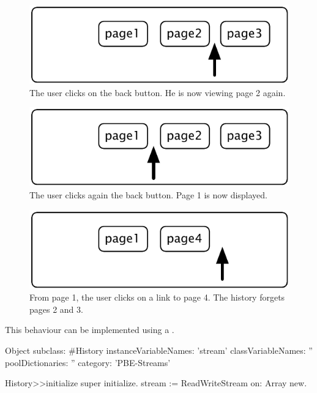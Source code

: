 \documentclass[a4paper,10pt,twoside]{book}
\begin{document}
\begin{figure}[!ht]
\centerline{\includegraphics[scale=0.5]{page2_Stef}}
\caption{The user clicks on the back button. He is now viewing page 2 again.}
\label{fig:page2_}
\vspace{.2in}
\end{figure}

\begin{figure}[!ht]
\centerline{\includegraphics[scale=0.5]{page1_Stef}}
\caption{The user clicks again the back button. Page 1 is now displayed.}
\label{fig:page1_}
\vspace{.2in}
\end{figure}

\begin{figure}[!ht]
\centerline{\includegraphics[scale=0.5]{page4Stef}}
\caption{From page 1, the user clicks on a link to page 4. The history forgets pages 2 and 3.}
\label{fig:page4}
\vspace{.2in}
\end{figure}

This behaviour can be implemented using a .

\begin{code}{}
Object subclass: #History
  instanceVariableNames: 'stream'
  classVariableNames: ''
  poolDictionaries: ''
  category: 'PBE-Streams'

History>>initialize
    super initialize.
    stream := ReadWriteStream on: Array new.
\end{code}
\end{document}
